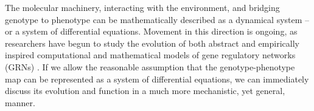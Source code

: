 \documentclass{article}
\newcommand{\1}{\mathbbm{1}}
\begin{document}

The molecular machinery, interacting with the environment, and bridging genotype to phenotype
can be mathematically described as a dynamical system -- or a system of differential equations\citep{jaeger2015comet}.
 Movement in this direction is ongoing, as researchers have begun to study 
the evolution of both abstract \citep{wagner1994evolution, wagner1996does,  siegal2002waddington, bergman2003evolutionary, draghi2015robustness} and empirically inspired computational and mathematical models of gene regulatory networks (GRNs) \citep{mjolsness1991connectionist, jaeger2004dynamic, maria1, vitaly1, vitaly2, crombach2016gap, wotton2015quantitative, chertkova2017insilico}. If we allow the reasonable assumption that the genotype-phenotype map can be represented as a system of differential equations, we can immediately discuss its evolution and function in a much more mechanistic, yet general, manner. 
\end{document}
